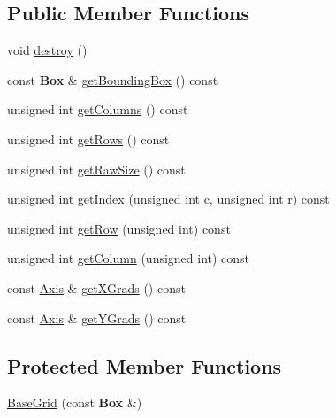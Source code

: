 \subsection*{Public Member Functions}
\begin{DoxyCompactItemize}
\item 
void \mbox{\hyperlink{classKatabatic_1_1BaseGrid_a3a80b6032f86a56bec74609034b3246f}{destroy}} ()
\item 
const \textbf{ Box} \& \mbox{\hyperlink{classKatabatic_1_1BaseGrid_a4b6cf5a28d88d7ad3e6ddeac28a35a0b}{get\+Bounding\+Box}} () const
\item 
unsigned int \mbox{\hyperlink{classKatabatic_1_1BaseGrid_aeaf0dae788f4c997e6172f9c734e3a91}{get\+Columns}} () const
\item 
unsigned int \mbox{\hyperlink{classKatabatic_1_1BaseGrid_a4bad6abc58473d953258a3230506291a}{get\+Rows}} () const
\item 
unsigned int \mbox{\hyperlink{classKatabatic_1_1BaseGrid_a47cf844f090417180d0bae098133565e}{get\+Raw\+Size}} () const
\item 
unsigned int \mbox{\hyperlink{classKatabatic_1_1BaseGrid_aae84726d9984c1df9905fc97d9b34f28}{get\+Index}} (unsigned int c, unsigned int r) const
\item 
unsigned int \mbox{\hyperlink{classKatabatic_1_1BaseGrid_a8108a276ab72226244d302fb1b59f3f1}{get\+Row}} (unsigned int) const
\item 
unsigned int \mbox{\hyperlink{classKatabatic_1_1BaseGrid_a21a8582c0c89a61d1963262fa053bc1b}{get\+Column}} (unsigned int) const
\item 
const \mbox{\hyperlink{classKatabatic_1_1BaseGrid_1_1Axis}{Axis}} \& \mbox{\hyperlink{classKatabatic_1_1BaseGrid_a1e3eea49f6f58fb8d0b3fa73f5cf3fd7}{get\+X\+Grads}} () const
\item 
const \mbox{\hyperlink{classKatabatic_1_1BaseGrid_1_1Axis}{Axis}} \& \mbox{\hyperlink{classKatabatic_1_1BaseGrid_ab11d8b83eaa19f5fe6fecc63a8bb203e}{get\+Y\+Grads}} () const
\end{DoxyCompactItemize}
\subsection*{Protected Member Functions}
\begin{DoxyCompactItemize}
\item 
\mbox{\hyperlink{classKatabatic_1_1BaseGrid_ac479157e8ac115074615167e8a4a2789}{Base\+Grid}} (const \textbf{ Box} \&)
\end{DoxyCompactItemize}


